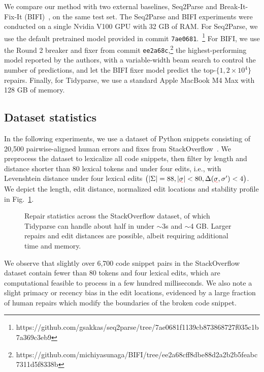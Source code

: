 \documentclass[sigplan,review,acmsmall,nonacm,screen,anonymous]{acmart}\settopmatter{printfolios=false,printccs=false,printacmref=false}
\begin{document}
We compare our method with two external baselines, Seq2Parse and Break-It-Fix-It (BIFI)~\cite{yasunaga2021break}, on the same test set. The Seq2Parse and BIFI experiments were conducted on a single Nvidia V100 GPU with 32 GB of RAM. For Seq2Parse, we use the default pretrained model provided in commit \texttt{7ae0681}.~\footnote{https://github.com/gsakkas/seq2parse/tree/7ae0681f1139cb873868727f035c1b7a369c3eb9} For BIFI, we use the Round 2 breaker and fixer from commit \texttt{ee2a68c},\footnote{https://github.com/michiyasunaga/BIFI/tree/ee2a68cff8dbe88d2a2b2b5feabc7311d5f8338b} the highest-performing model reported by the authors, with a variable-width beam search to control the number of predictions, and let the BIFI fixer model predict the top-$\{1, 2\times 10^4\}$ repairs. Finally, for Tidyparse, we use a standard Apple MacBook M4 Max with 128 GB of memory.

\clearpage\subsection{Dataset statistics}\label{sec:rq1}

In the following experiments, we use a dataset of Python snippets consisting of 20,500 pairwise-aligned human errors and fixes from StackOverflow~\cite{wong2019syntax}. We preprocess the dataset to lexicalize all code snippets, then filter by length and distance shorter than 80 lexical tokens and under four edits, i.e., with Levenshtein distance under four lexical edits $\big(|\Sigma| = 88, |\err{\sigma}| < 80, \Delta(\err{\sigma}, \sigma') < 4\big)$. We depict the length, edit distance, normalized edit locations and stability profile in Fig.~\ref{fig:patch_stats}.\vspace{-0.2cm}

\begin{figure}[h!]

\vspace{-0.2cm}
\caption{Repair statistics across the StackOverflow dataset, of which Tidyparse can handle about half in under $\sim$3s and $\sim$4 GB. Larger repairs and edit distances are possible, albeit requiring additional time and memory.}\label{fig:patch_stats}\vspace{-0.2cm}
\end{figure}

We observe that slightly over 6,700 code snippet pairs in the StackOverflow dataset contain fewer than 80 tokens and four lexical edits, which are computational feasible to process in a few hundred milliseconds. We also note a slight primacy or recency bias in the edit locations, evidenced by a large fraction of human repairs which modify the boundaries of the broken code snippet.
\end{document}
